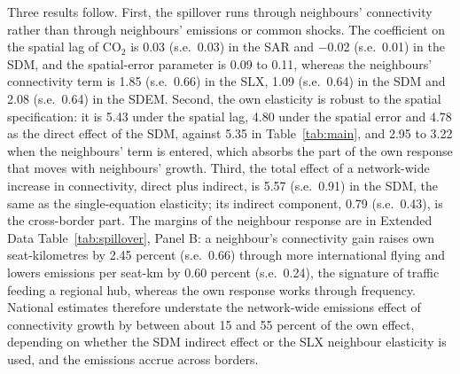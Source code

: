 \documentclass[12pt]{article}
\begin{document}
Three results follow. First, the spillover runs through neighbours'
connectivity rather than through neighbours' emissions or common shocks.
The coefficient on the spatial lag of CO$_2$ is 0.03 (s.e.\ 0.03) in
the SAR and $-$0.02 (s.e.\ 0.01) in the SDM, and the spatial-error
parameter is 0.09 to 0.11, whereas the neighbours' connectivity term is
1.85 (s.e.\ 0.66) in the SLX, 1.09 (s.e.\ 0.64) in the SDM and
2.08 (s.e.\ 0.64) in the SDEM. Second, the own elasticity is robust to
the spatial specification: it is 5.43 under the spatial lag, 4.80 under
the spatial error and 4.78 as the direct effect of the SDM, against 5.35
in Table~\ref{tab:main}, and 2.95 to 3.22 when the neighbours' term is entered,
which absorbs the part of the own response that moves with neighbours'
growth. Third, the total effect of a network-wide increase in
connectivity, direct plus indirect, is 5.57 (s.e.\ 0.91) in the SDM, the
same as the single-equation elasticity; its indirect component,
0.79 (s.e.\ 0.43), is the cross-border part. The margins of the
neighbour response are in Extended Data Table~\ref{tab:spillover}, Panel
B: a neighbour's connectivity gain raises own seat-kilometres by 2.45
percent (s.e.\ 0.66) through more international flying and
lowers emissions per seat-km by 0.60 percent (s.e.\ 0.24), the signature
of traffic feeding a regional hub, whereas the own response works through
frequency. National estimates therefore understate the network-wide
emissions effect of connectivity growth by between about
15 and 55 percent of the own effect, depending on whether the SDM
indirect effect or the SLX neighbour elasticity is used, and the emissions
accrue across borders.
\end{document}
